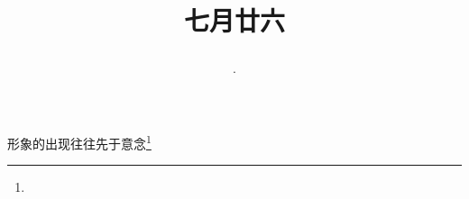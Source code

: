 \title{\date[d=29,m=8,y=2024][year:cn-y,年,month:cn,day:cn,日,·,weekday]·七月廿六 }
形象的出现往往先于意念\footnote{ }

